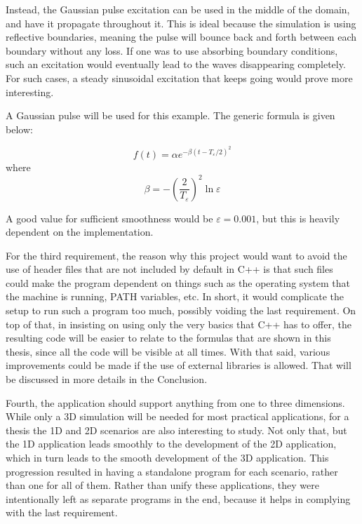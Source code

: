 Instead, the Gaussian pulse excitation can be used in the middle of the domain, and have it propagate throughout it. This is ideal because the simulation is using reflective boundaries, meaning the pulse will bounce back and forth between each boundary without any loss. If one was to use absorbing boundary conditions, such an excitation would eventually lead to the waves disappearing completely. For such cases, a steady sinusoidal excitation that keeps going would prove more interesting.

A Gaussian pulse will be used for this example. The generic formula is given below:

\begin{equation}
	\label{eqn:gaussianPulse}
	f(t) = \alpha e^{-\beta(t - T_\varepsilon/2)^2}
\end{equation}
where
\begin{equation}
	\label{eqn:gaussianBeta}
	\beta = - (\frac{2}{T_\varepsilon})^2 \ln\varepsilon
\end{equation}

A good value for sufficient smoothness would be $\varepsilon = 0.001$, but this is heavily dependent on the implementation.

For the third requirement, the reason why this project would want to avoid the use of header files that are not included by default in C++ is that such files could make the program dependent on things such as the operating system that the machine is running, PATH variables, etc. In short, it would complicate the setup to run such a program too much, possibly voiding the last requirement. On top of that, in insisting on using only the very basics that C++ has to offer, the resulting code will be easier to relate to the formulas that are shown in this thesis, since all the code will be visible at all times. With that said, various improvements could be made if the use of external libraries is allowed. That will be discussed in more details in the Conclusion.

Fourth, the application should support anything from one to three dimensions. While only a 3D simulation will be needed for most practical applications, for a thesis the 1D and 2D scenarios are also interesting to study. Not only that, but the 1D application leads smoothly to the development of the 2D application, which in turn leads to the smooth development of the 3D application. This progression resulted in having a standalone program for each scenario, rather than one for all of them. Rather than unify these applications, they were intentionally left as separate programs in the end, because it helps in complying with the last requirement.

